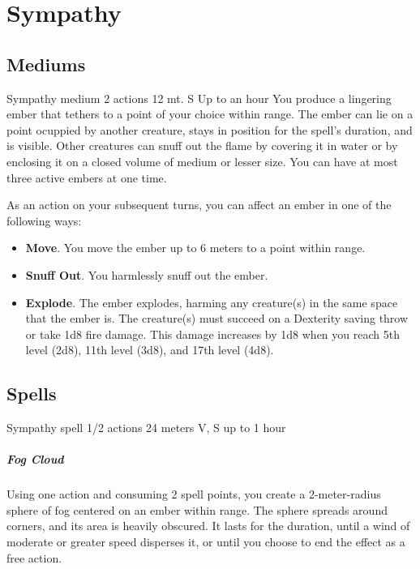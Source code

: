 \section{Sympathy}
\subsection*{Mediums}
        {Sympathy medium}
        {2 actions}
        {12 mt.}
        {S}
        {Up to an hour}
        You produce a lingering ember that tethers to a point of your choice within range.
        The ember can lie on a point ocuppied by another creature, stays in position for the spell's duration, and is visible.
        Other creatures can snuff out the flame by covering it in water or by enclosing it on a closed volume of medium or lesser size.
        You can have at most three active embers at one time.

        As an action on your subsequent turns, you can affect an ember in one of the following ways:
        \begin{itemize}
            \item \textbf{Move}.
            You move the ember up to 6 meters to a point within range.
            \item \textbf{Snuff Out}.
            You harmlessly snuff out the ember.
            \item \textbf{Explode}.
            The ember explodes, harming any creature(s) in the same space that the ember is.
            The creature(s) must succeed on a Dexterity saving throw or take 1d8 fire damage.
            This damage increases by 1d8 when you reach 5th level (2d8), 11th level (3d8), and 17th level (4d8).
        \end{itemize}

\subsection*{Spells}
        {Sympathy spell}
        {1/2 actions}
        {24 meters}
        {V, S}
        {up to 1 hour}
        \subparagraph{Fog Cloud}
            Using one action and consuming 2 spell points, you create a 2-meter-radius sphere of fog centered on an ember within range.
            The sphere spreads around corners, and its area is heavily obscured.
            It lasts for the duration, until a wind of moderate or greater speed disperses it, or until you choose to end the effect as a free action.

